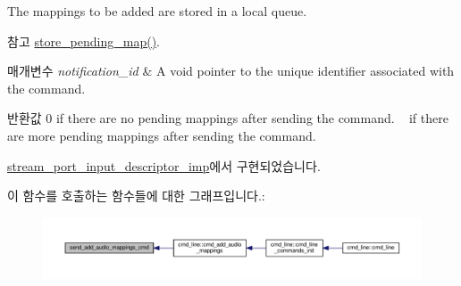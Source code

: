 The mappings to be added are stored in a local queue. \begin{DoxySeeAlso}{참고}
\hyperlink{classavdecc__lib_1_1stream__port__input__descriptor_ac1774e84412c74378819f20d257a7653}{store\+\_\+pending\+\_\+map()}.
\end{DoxySeeAlso}

\begin{DoxyParams}{매개변수}
{\em notification\+\_\+id} & A void pointer to the unique identifier associated with the command.\\
\hline
\end{DoxyParams}
\begin{DoxyReturn}{반환값}
0 if there are no pending mappings after sending the command. ~ if there are more pending mappings after sending the command. 
\end{DoxyReturn}


\hyperlink{classavdecc__lib_1_1stream__port__input__descriptor__imp_a607418ce38a1e4cbb44bd670eb0f398b}{stream\+\_\+port\+\_\+input\+\_\+descriptor\+\_\+imp}에서 구현되었습니다.



이 함수를 호출하는 함수들에 대한 그래프입니다.\+:
\nopagebreak
\begin{figure}[H]
\begin{center}
\leavevmode
\includegraphics[width=350pt]{classavdecc__lib_1_1stream__port__input__descriptor_a5d94b5190eaba5a650afd90d6e483d72_icgraph}
\end{center}
\end{figure}


